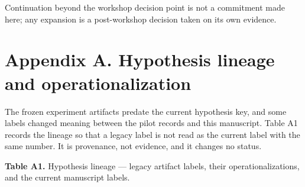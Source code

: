 \documentclass[
  10pt,
]{article}
\renewcommand{\_}{\origunderscore\allowbreak}
\begin{document}
Continuation beyond the workshop decision point is not a commitment made
here; any expansion is a post-workshop decision taken on its own
evidence.

\section{Appendix A. Hypothesis lineage and
operationalization}\label{appendix-a.-hypothesis-lineage-and-operationalization}

The frozen experiment artifacts predate the current hypothesis key, and
some labels changed meaning between the pilot records and this
manuscript. Table A1 records the lineage so that a legacy label is not
read as the current label with the same number. It is provenance, not
evidence, and it changes no status.

\textbf{Table A1.} Hypothesis lineage --- legacy artifact labels, their
operationalizations, and the current manuscript labels.
\end{document}

